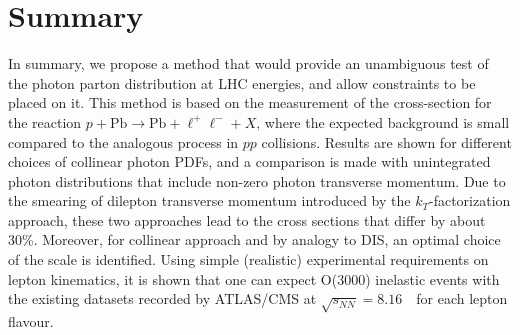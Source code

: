 \section{Summary}

In summary, we propose a method that would provide an unambiguous test of the photon parton distribution at LHC energies, and allow 
constraints to be placed on it.
This method is based on the measurement of the cross-section for the reaction $p+\textrm{Pb}\rightarrow \textrm{Pb} + \ell^+\ell^- + X$, where the expected background is small compared to the analogous process in $pp$ collisions. 
Results are shown for different choices of collinear photon PDFs, and a comparison is made with unintegrated photon distributions that include non-zero photon transverse momentum.
Due to the smearing of dilepton transverse momentum introduced by the $k_T$-factorization approach, these two approaches lead to the cross sections that differ by about 30\%.
Moreover, for collinear approach and  by analogy to DIS, an optimal choice of the scale is identified.
Using simple (realistic) experimental requirements on lepton kinematics, it is shown that one can expect O(3000) inelastic events with the existing datasets recorded by ATLAS/CMS at $\sqrt{s_{N N}} = 8.16$~\TeV\ for each lepton flavour.
